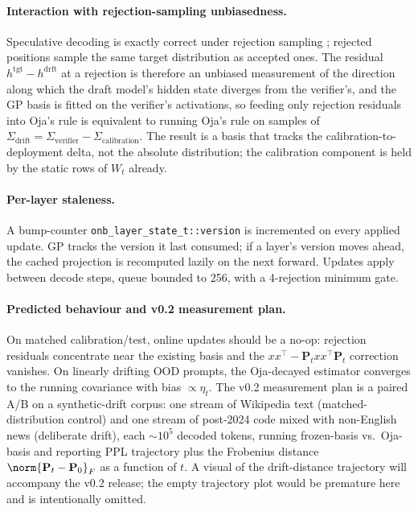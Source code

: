 \documentclass[11pt]{article}
\providecommand{\Pmat}{\mathbf{P}}
\begin{document}
\paragraph{Interaction with rejection-sampling unbiasedness.}
Speculative decoding is exactly correct under rejection sampling
\cite{leviathan2023speculative}; rejected positions sample the same
target distribution as accepted ones. The residual
$h^\text{tgt}-h^\text{drft}$ at a rejection is therefore an unbiased
measurement of the direction along which the draft model's hidden state
diverges from the verifier's, and the GP basis is fitted on the
verifier's activations, so feeding only rejection residuals into Oja's
rule is equivalent to running Oja's rule on samples of
$\Sigma_\text{drift}=\Sigma_\text{verifier}-\Sigma_\text{calibration}$.
The result is a basis that tracks the calibration-to-deployment delta,
not the absolute distribution; the calibration component is held by the
static rows of $W_t$ already.

\paragraph{Per-layer staleness.}  A bump-counter
\texttt{onb\_layer\_state\_t::version} is incremented on every applied
update. GP tracks the version it last consumed; if a layer's version
moves ahead, the cached projection is recomputed lazily on the next
forward. Updates apply between decode steps, queue bounded to 256, with
a 4-rejection minimum gate.

\paragraph{Predicted behaviour and v0.2 measurement plan.}
On matched calibration/test, online updates should be a no-op:
rejection residuals concentrate near the existing basis and the
$xx^\top-\Pmat_t xx^\top\Pmat_t$ correction vanishes. On linearly
drifting OOD prompts, the Oja-decayed estimator converges to the
running covariance with bias $\propto\eta_t$. The v0.2 measurement plan
is a paired A/B on a synthetic-drift corpus: one stream of Wikipedia
text (matched-distribution control) and one stream of post-2024 code
mixed with non-English news (deliberate drift), each $\sim 10^5$
decoded tokens, running frozen-basis vs.\ Oja-basis and reporting PPL
trajectory plus the Frobenius distance $\norm{\Pmat_t-\Pmat_0}_F$ as a
function of $t$. A visual of the drift-distance trajectory will
accompany the v0.2 release; the empty trajectory plot would be
premature here and is intentionally omitted.
\end{document}
